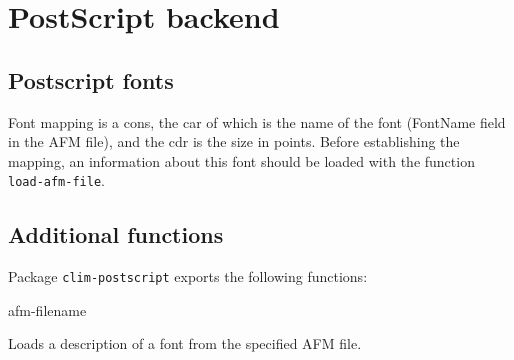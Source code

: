 \chapter{PostScript backend}

\section{Postscript fonts}

Font mapping is a cons, the car of which is the name of the font
(FontName field in the AFM file), and the cdr is the size in points.
Before establishing the mapping, an information about this font should
be loaded with the function \texttt{load-afm-file}.

\section{Additional functions}

Package \texttt{clim-postscript} exports the following functions:

 {afm-filename}

Loads a description of a font from the specified AFM file.
